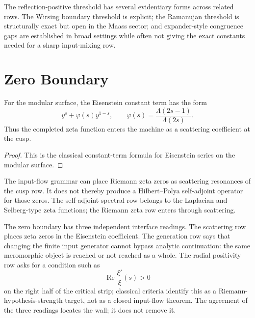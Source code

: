 \begin{principle}
\label{prin:innovation-input-modular-ramanujan-status-split}
The reflection-positive threshold has several evidentiary forms across
related rows. The Wirsing boundary threshold is explicit; the Ramanujan
threshold is structurally exact but open in the Maass sector; and
expander-style congruence gaps are established in broad settings while
often not giving the exact constants needed for a sharp input-mixing row.
\end{principle}

\section{Zero Boundary}
\label{sec:innovation-input-modular-zero-boundary}

\begin{theorem}
\label{thm:innovation-input-modular-zeta-scattering}
For the modular surface, the Eisenstein constant term has the form
$$
y^s+\varphi(s)y^{1-s},
\qquad
\varphi(s)=\frac{\Lambda(2s-1)}{\Lambda(2s)}.
$$
Thus the completed zeta function enters the machine as a scattering
coefficient at the cusp.
\end{theorem}

\begin{proof}
This is the classical constant-term formula for Eisenstein series on the
modular surface.
\end{proof}

\begin{principle}
\label{prin:innovation-input-modular-zero-location-boundary}
The input-flow grammar can place Riemann zeta zeros as scattering
resonances of the cusp row. It does not thereby produce a Hilbert--Polya
self-adjoint operator for those zeros. The self-adjoint spectral row belongs
to the Laplacian and Selberg-type zeta functions; the Riemann zeta row enters
through scattering.
\end{principle}

\begin{principle}
\label{prin:innovation-input-modular-three-zero-boundary-instruments}
The zero boundary has three independent interface readings. The scattering
row places zeta zeros in the Eisenstein coefficient. The generation row says
that changing the finite input generator cannot bypass analytic continuation:
the same meromorphic object is reached or not reached as a whole. The radial
positivity row asks for a condition such as
$$
\operatorname{Re}\frac{\xi'}{\xi}(s)>0
$$
on the right half of the critical strip; classical criteria identify this
as a Riemann-hypothesis-strength target, not as a closed input-flow theorem.
The agreement of the three readings locates the wall; it does not remove it.
\end{principle}

